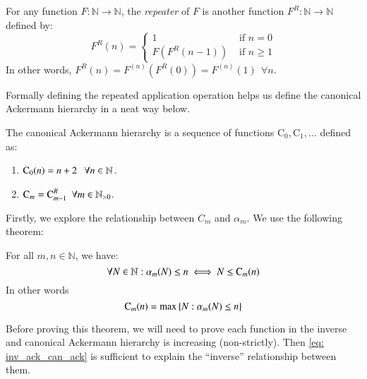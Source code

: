 \begin{defn} \label{defn: rep_app}
For any function $F: \mathbb{N} \to \mathbb{N}$, the \textit{repeater} of $F$ is another function $F^R : \mathbb{N} \to \mathbb{N}$ defined by:
\begin{equation}
F^R(n) = \begin{cases}
1 & \text{ if } n = 0 \\ F\left(F^R(n - 1)\right) & \text{ if } n \ge 1
\end{cases}
\end{equation}
In other words, $F^R(n) = F^{(n)}\left(F^R(0)\right) = F^{(n)}(1) \ \ \forall n$.
\end{defn}

Formally defining the repeated application operation helps us define the canonical Ackermann hierarchy in a neat way below.

\begin{defn} \label{defn: can_ack_hier}
The canonical Ackermann hierarchy is a sequence of functions $\text{C}_0, \text{C}_1, \ldots $ defined as:
\begin{enumerate}
	\item $\text{C}_0(n) = n + 2 \ \ \ \forall n\in \mathbb{N}$.
	\item $\text{C}_m = \text{C}_{m-1}^R \ \ \forall m\in \mathbb{N}_{>0}$.
\end{enumerate}
\end{defn}

Firstly, we explore the relationship between $C_m$ and $\alpha_m$. We use the following theorem:

\begin{thm} \label{thm: inv_ack_can_ack}
For all $m, n \in \mathbb{N}$, we have:
\begin{equation} \label{eq: inv_ack_can_ack}
\forall N \in \mathbb{N}: \alpha_m(N) \le n \iff N \le \text{C}_m(n)
\end{equation}
In other words
\begin{equation} \label{eq: inv_ack_can_ack_0}
\text{C}_m(n) = \max\left\{N : \alpha_m(N) \le n\right\}
\end{equation}
\end{thm}

Before proving this theorem, we will need to prove each function in the inverse and canonical Ackermann hierarchy is increasing (non-strictly). Then \eqref{eq: inv_ack_can_ack} is sufficient to explain the ``inverse'' relationship between them.

%
%
%
%

